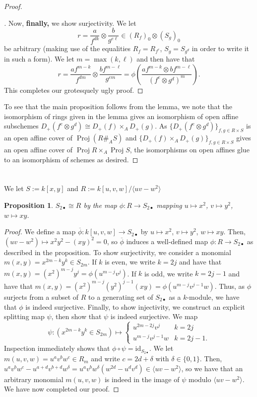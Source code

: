 \documentclass[english,letter,doublesided]{article}
\newcommand{\ldt}{\bullet}
\newenvironment{subproof}[1][\proofname]{%
	\renewcommand{\qedsymbol}{$\blacksquare$}%
	\begin{proof}[#1]%
	}{%
	\end{proof}%
}
\newcommand{\prob}[1]{\setcounter{section}{#1-1}\section{}}
\newtheorem*{prop*}{Proposition}
\theoremstyle{remark}
\theoremstyle{definition}
\newcommand{\idl}[1]{\langle #1 \rangle}
\newcommand{\id}{\mathrm{id} }
\DeclareMathOperator{\proj}{Proj}
\newcommand{\bph}{\overline{\phi}}
\begin{document}
\begin{proof}
\begin{subproof}
 Now, \textbf{finally,} we show surjectivity. We let $$r=\frac{a}{f^{dk}}\otimes \frac{b}{g^{e\ell}}\in (R_f)_0\otimes (S_g)_0$$ be arbitrary (making use of the equalities $R_f=R_{f^e}$, $S_g=S_{g^d}$ in order to write it in such a form). We let $m=\max(k,\ell)$ and then have that $$r=\frac{af^{m-k}}{f^{dm}}\otimes \frac{bf^{m-\ell}}{g^{em}}=\phi\left(\frac{af^{m-k}\otimes bf^{m-\ell}}{(f^e\otimes g^d)^m}\right).$$ This completes our grotesquely ugly proof.
\end{subproof}
To see that the main proposition follows from the lemma, we note that the isomorphism of rings given in the lemma gives an isomorphism of open affine subschemes $D_+(f^e\otimes g^d)\cong D_+(f)\times_AD_+(g)$. As $\{D_+(f^e\otimes g^d)\}_{f,g\in R\times S}$ is an open affine cover of $\proj(R\#_A S)$ and $\{D_+(f)\times_AD_+(g)\}_{f,g\in R\times S}$ gives an open affine cover of $\proj R\times_A\proj S$, the isomorphisms on open affines glue to an isomorphism of schemes as desired.
\end{proof}
	\prob{4}
	\prob{5}We let $S:=k[x,y]$ and $R:=k[u,v,w]/\idl{uv-w^2}$
	\begin{prop*}
		$S_{2\ldt}\cong R$ by the map $\phi:R\to S_{2\ldt}$ mapping $u\mapsto x^2$, $v\mapsto y^2$, $w\mapsto xy$. 
	\end{prop*}
\begin{proof}
We define a map $\bph: k[u,v,w]\to S_{2\ldt}$ by $u\mapsto x^2$, $v\mapsto y^2$, $w\mapsto xy$. Then, $(uv-w^2)\mapsto x^2y^2-(xy)^2=0$, so $\bph$ induces a well-defined map $\phi:R\to S_{2\ldt}$ as described in the proposition. To show surjectivity, we consider a monomial $m(x,y)=x^{2m-k}y^k\in S_{2m}$. If $k$ is even, we write $k=2j$ and have that $m(x,y)=(x^2)^{m-j}y^j=\phi(u^{m-j}v^{j})$. If $k$ is odd, we write $k=2j-1$ and have that $m(x,y)=(x^2)^{m-j}(y^2)^{j-1}(xy)=\phi(u^{m-j}v^{j-1}w)$. Thus, as $\phi$ surjects from a subset of $R$ to a generating set of $S_{2\ldt}$ as a $k$-module, we have that $\phi$ is indeed surjective. Finally, to show injectivity, we construct an explicit splitting map $\psi$, then show that $\psi$ is indeed surjective. We map \begin{equation*}\psi: \left(x^{2m-k}y^k\in S_{2m}\right)\mapsto \begin{cases}
u^{2m-2j}v^j&k=2j\\
u^{m-j}v^{j-1}w&k=2j-1.
\end{cases}\end{equation*} Inspection immediately shows that $\phi\circ \psi=\id_{S_{2\ldt}}$. We let $m(u,v,w)=u^av^bw^c\in R_m$ and write $c=2d+\delta$ with $\delta\in \{0,1\}$. Then, $u^av^bw^c-u^{a+d}v^{b+d}w^\delta=u^av^bw^\delta(w^{2d}-u^dv^d)\in \idl{uv-w^2}$, so we have that an arbitrary monomial $m(u,v,w)$ is indeed in the image of $\psi$ modulo $\idl{uv-w^2}$. We have now completed our proof.
\end{proof}
	\prob{6}
	\prob{7}
	\prob{8}
\end{document}
